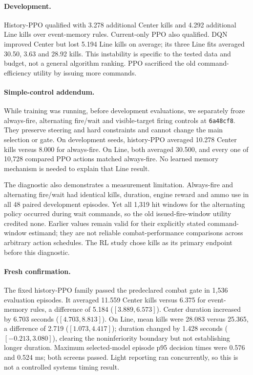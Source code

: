 \paragraph{Development.}
History-PPO qualified with 3.278 additional Center kills and 4.292 additional Line kills over event-memory rules. Current-only PPO also qualified. DQN improved Center but lost 5.194 Line kills on average; its three Line fits averaged 30.50, 3.63 and 28.92 kills. This instability is specific to the tested data and budget, not a general algorithm ranking. PPO sacrificed the old command-efficiency utility by issuing more commands.

\paragraph{Simple-control addendum.}
While training was running, before development evaluations, we separately froze always-fire, alternating fire/wait and visible-target firing controls at \texttt{6a48cf8}. They preserve steering and hard constraints and cannot change the main selection or gate. On development seeds, history-PPO averaged 10.278 Center kills versus 8.000 for always-fire. On Line, both averaged 30.500, and every one of 10,728 compared PPO actions matched always-fire. No learned memory mechanism is needed to explain that Line result.

The diagnostic also demonstrates a measurement limitation. Always-fire and alternating fire/wait had identical kills, duration, engine reward and ammo use in all 48 paired development episodes. Yet all 1,319 hit windows for the alternating policy occurred during wait commands, so the old issued-fire-window utility credited none. Earlier values remain valid for their explicitly stated command-window estimand; they are not reliable combat-performance comparisons across arbitrary action schedules. The RL study chose kills as its primary endpoint before this diagnostic.

\paragraph{Fresh confirmation.}
The fixed history-PPO family passed the predeclared combat gate in 1,536 evaluation episodes. It averaged 11.559 Center kills versus 6.375 for event-memory rules, a difference of 5.184 ($[3.889,6.573]$). Center duration increased by 6.703 seconds ($[4.703,8.813]$). On Line, mean kills were 28.083 versus 25.365, a difference of 2.719 ($[1.073,4.417]$); duration changed by 1.428 seconds ($[-0.213,3.080]$), clearing the noninferiority boundary but not establishing longer duration. Maximum selected-model episode p95 decision times were 0.576 and 0.524 ms; both screens passed. Light reporting ran concurrently, so this is not a controlled systems timing result.

